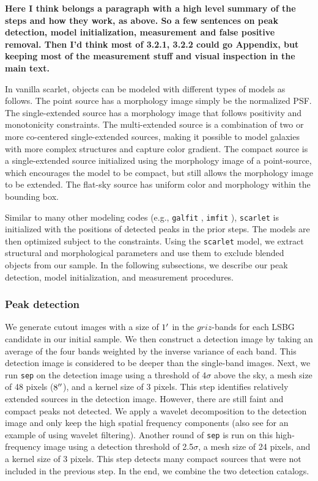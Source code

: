 \documentclass[twocolumn,astrosymb,twocolappendix]{aastex631}
\newcommand{\code}[1]{\texttt{#1}}
\begin{document}
\begin{CJK*}{UTF8}{gbsn}
{\bf Here I think belongs a paragraph with a high level summary of the steps and how they work, as above. So a few sentences on peak detection, model initialization, measurement and false positive removal. Then I'd think most of 3.2.1, 3.2.2 could go Appendix, but keeping most of the measurement stuff and visual inspection in the main text.}

In vanilla scarlet, objects can be modeled with different types of models as follows. The point source has a morphology image simply be the normalized PSF. The single-extended source has a morphology image that follows positivity and monotonicity constraints. The multi-extended source is a combination of two or more co-centered single-extended sources, making it possible to model galaxies with more complex structures and capture color gradient. The compact source is a single-extended source initialized using the morphology image of a point-source, which encourages the model to be compact, but still allows the morphology image to be extended. The flat-sky source has uniform color and morphology within the bounding box.

Similar to many other modeling codes (e.g., \code{galfit} \citealt{galfit}, \code{imfit} \citealt{imfit}), \code{scarlet} is initialized with the positions of detected peaks in the prior steps. The models are then optimized subject to the constraints. Using the \code{scarlet} model, we extract structural and morphological parameters and use them to exclude blended objects from our sample. In the following subsections, we describe our peak detection, model initialization, and measurement procedures. 

\subsubsection{Peak detection}\label{sec:peak}
We generate cutout images with a size of $1\mbox{$^\prime$}$ in the $griz$-bands for each LSBG candidate in our initial sample. We then construct a detection image by taking an average of the four bands weighted by the inverse variance of each band. This detection image is considered to be deeper than the single-band images. 
Next, we run \code{sep} on the detection image using a threshold of 4$\sigma$ above the sky, a mesh size of 48 pixels ($8\mbox{$^{\prime\prime}$}$), and a kernel size of 3 pixels. This step identifies relatively extended sources in the detection image. However, there are still faint and compact peaks not detected. We apply a wavelet decomposition to the detection image \citep{Starck2015} and only keep the high spatial frequency components (also see \citealt{Zaritsky2019} for an example of using wavelet filtering). Another round of \code{sep} is run on this high-frequency image using a detection threshold of 2.5$\sigma$, a mesh size of 24 pixels, and a kernel size of 3 pixels. This step detects many compact sources that were not included in the previous step. In the end, we combine the two detection catalogs. 


\end{CJK*}
\end{document}
